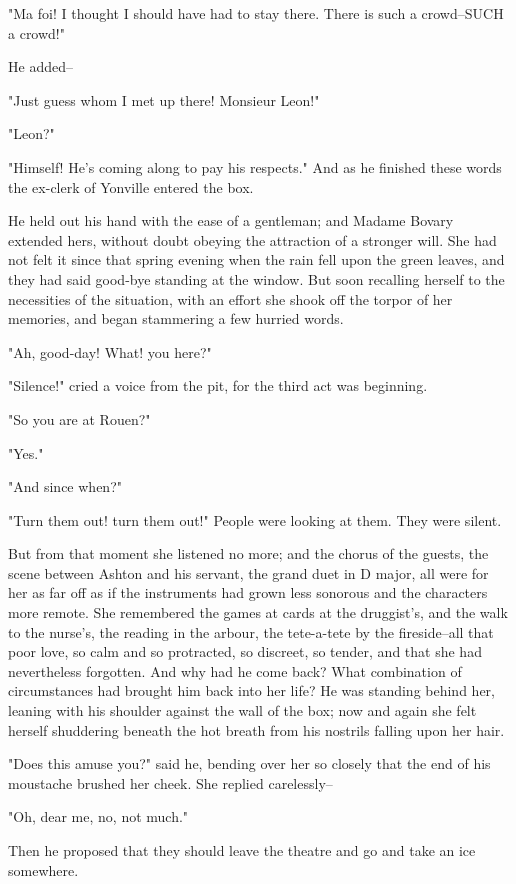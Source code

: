 \documentclass[11pt,twocolumn]{ltugboat}
\begin{document}
"Ma foi! I thought I should have had to stay there. There is such a
crowd--SUCH a crowd!"

He added--

"Just guess whom I met up there! Monsieur Leon!"

"Leon?"

"Himself! He's coming along to pay his respects." And as he finished
these words the ex-clerk of Yonville entered the box.

He held out his hand with the ease of a gentleman; and Madame Bovary
extended hers, without doubt obeying the attraction of a stronger will.
She had not felt it since that spring evening when the rain fell upon
the green leaves, and they had said good-bye standing at the window.
But soon recalling herself to the necessities of the situation, with an
effort she shook off the torpor of her memories, and began stammering a
few hurried words.

"Ah, good-day! What! you here?"

"Silence!" cried a voice from the pit, for the third act was beginning.

"So you are at Rouen?"

"Yes."

"And since when?"

"Turn them out! turn them out!" People were looking at them. They were
silent.

But from that moment she listened no more; and the chorus of the guests,
the scene between Ashton and his servant, the grand duet in D major, all
were for her as far off as if the instruments had grown less sonorous
and the characters more remote. She remembered the games at cards at the
druggist's, and the walk to the nurse's, the reading in the arbour,
the tete-a-tete by the fireside--all that poor love, so calm and so
protracted, so discreet, so tender, and that she had nevertheless
forgotten. And why had he come back? What combination of circumstances
had brought him back into her life? He was standing behind her, leaning
with his shoulder against the wall of the box; now and again she felt
herself shuddering beneath the hot breath from his nostrils falling upon
her hair.

"Does this amuse you?" said he, bending over her so closely that the end
of his moustache brushed her cheek. She replied carelessly--

"Oh, dear me, no, not much."

Then he proposed that they should leave the theatre and go and take an
ice somewhere.
\end{document}
